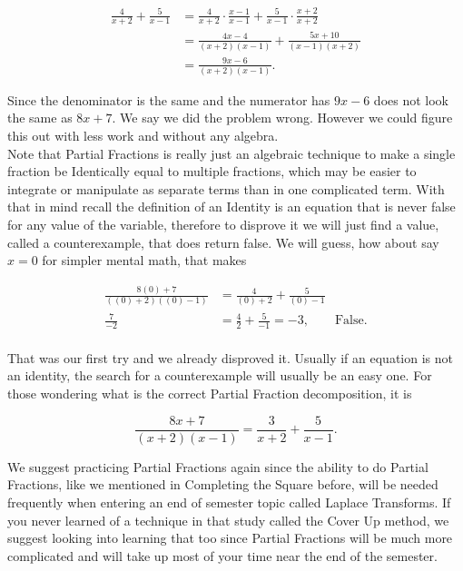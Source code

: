 \documentclass[12pt]{article}
\begin{document}
\begin{align*}
    \frac{4}{x+2}+\frac{5}{x-1} &= \frac{4}{x+2}\cdot \frac{x-1}{x-1}+\frac{5}{x-1}\cdot \frac{x+2}{x+2} \\
     &= \frac{4x-4}{(x+2)(x-1)}+\frac{5x+10}{(x-1)(x+2)} \\
     &= \frac{9x-6}{(x+2)(x-1)}.
\end{align*}

Since the denominator is the same and the numerator has $9x-6$ does not look the same as $8x+7$. We say we did the problem wrong. However we could figure this out with less work and without any algebra. \\

Note that Partial Fractions is really just an algebraic technique to make a single fraction be Identically equal to multiple fractions, which may be easier to integrate or manipulate as separate terms than in one complicated term. With that in mind recall the definition of an Identity is an equation that is never false for any value of the variable, therefore to disprove it we will just find a value, called a counterexample, that does return false. We will guess, how about say $x=0$ for simpler mental math, that makes

\begin{align*}
    \frac{8(0)+7}{((0)+2)((0)-1)}&=\frac{4}{(0)+2}+\frac{5}{(0)-1} \\
    \frac{7}{-2}&=\frac{4}{2}+\frac{5}{-1}=-3, \qquad \text{False.} \\
\end{align*}

That was our first try and we already disproved it. Usually if an equation is not an identity, the search for a counterexample will usually be an easy one. For those wondering what is the correct Partial Fraction decomposition, it is

\begin{equation*}
    \frac{8x+7}{(x+2)(x-1)}=\frac{3}{x+2}+\frac{5}{x-1}.
\end{equation*}

We suggest practicing Partial Fractions again since the ability to do Partial Fractions, like we mentioned in Completing the Square before, will be needed frequently when entering an end of semester topic called Laplace Transforms. If you never learned of a technique in that study called the Cover Up method, we suggest looking into learning that too since Partial Fractions will be much more complicated and will take up most of your time near the end of the semester.
\end{document}
